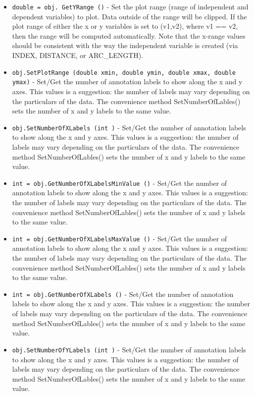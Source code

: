 \begin{itemize}
\item  \verb|double = obj. GetYRange ()| -  Set the plot range (range of independent and dependent variables)
 to plot. Data outside of the range will be clipped. If the plot
 range of either the x or y variables is set to (v1,v2), where
 v1 == v2, then the range will be computed automatically. Note that
 the x-range values should be consistent with the way the independent
 variable is created (via INDEX, DISTANCE, or ARC\_LENGTH).

\item  \verb|obj.SetPlotRange (double xmin, double ymin, double xmax, double ymax)| -  Set/Get the number of annotation labels to show along the x and y axes.
 This values is a suggestion: the number of labels may vary depending
 on the particulars of the data. The convenience method 
 SetNumberOfLables() sets the number of x and y labels to the same value.

\item  \verb|obj.SetNumberOfXLabels (int )| -  Set/Get the number of annotation labels to show along the x and y axes.
 This values is a suggestion: the number of labels may vary depending
 on the particulars of the data. The convenience method 
 SetNumberOfLables() sets the number of x and y labels to the same value.

\item  \verb|int = obj.GetNumberOfXLabelsMinValue ()| -  Set/Get the number of annotation labels to show along the x and y axes.
 This values is a suggestion: the number of labels may vary depending
 on the particulars of the data. The convenience method 
 SetNumberOfLables() sets the number of x and y labels to the same value.

\item  \verb|int = obj.GetNumberOfXLabelsMaxValue ()| -  Set/Get the number of annotation labels to show along the x and y axes.
 This values is a suggestion: the number of labels may vary depending
 on the particulars of the data. The convenience method 
 SetNumberOfLables() sets the number of x and y labels to the same value.

\item  \verb|int = obj.GetNumberOfXLabels ()| -  Set/Get the number of annotation labels to show along the x and y axes.
 This values is a suggestion: the number of labels may vary depending
 on the particulars of the data. The convenience method 
 SetNumberOfLables() sets the number of x and y labels to the same value.

\item  \verb|obj.SetNumberOfYLabels (int )| -  Set/Get the number of annotation labels to show along the x and y axes.
 This values is a suggestion: the number of labels may vary depending
 on the particulars of the data. The convenience method 
 SetNumberOfLables() sets the number of x and y labels to the same value.


\end{itemize}
